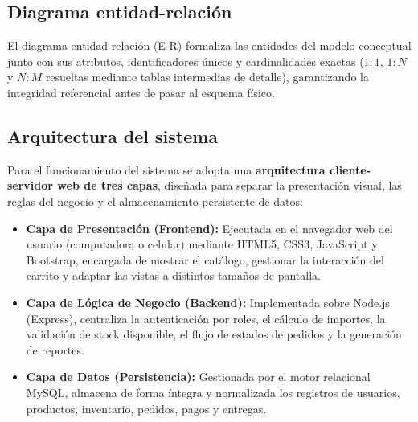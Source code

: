 
\subsection{Diagrama entidad-relación}
El diagrama entidad-relación (E-R) formaliza las entidades del modelo conceptual junto con sus atributos, identificadores únicos y cardinalidades exactas ($1:1$, $1:N$ y $N:M$ resueltas mediante tablas intermedias de detalle), garantizando la integridad referencial antes de pasar al esquema físico.


\subsection{Arquitectura del sistema}
Para el funcionamiento del sistema se adopta una \textbf{arquitectura cliente-servidor web de tres capas}, diseñada para separar la presentación visual, las reglas del negocio y el almacenamiento persistente de datos:
\begin{itemize}
    \item \textbf{Capa de Presentación (Frontend):} Ejecutada en el navegador web del usuario (computadora o celular) mediante HTML5, CSS3, JavaScript y Bootstrap, encargada de mostrar el catálogo, gestionar la interacción del carrito y adaptar las vistas a distintos tamaños de pantalla.
    \item \textbf{Capa de Lógica de Negocio (Backend):} Implementada sobre Node.js (Express), centraliza la autenticación por roles, el cálculo de importes, la validación de stock disponible, el flujo de estados de pedidos y la generación de reportes.
    \item \textbf{Capa de Datos (Persistencia):} Gestionada por el motor relacional MySQL, almacena de forma íntegra y normalizada los registros de usuarios, productos, inventario, pedidos, pagos y entregas.
\end{itemize}


